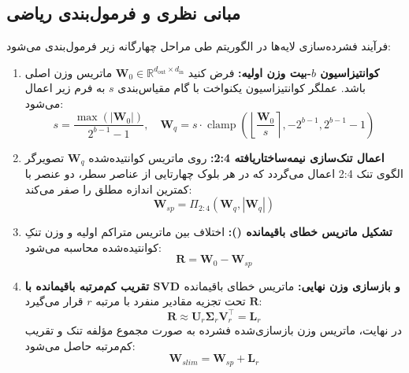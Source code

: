 \subsection{مبانی نظری و فرمول‌بندی ریاضی}
فرآیند فشرده‌سازی لایه‌ها در الگوریتم  طی مراحل چهارگانه زیر فرمول‌بندی می‌شود:
\begin{enumerate}
    \item \textbf{کوانتیزاسیون $b$-بیت وزن اولیه:}
    فرض کنید $\mathbf{W}_0 \in \mathbb{R}^{d_{\text{out}} \times d_{\text{in}}}$ ماتریس وزن اصلی باشد. عملگر کوانتیزاسیون یکنواخت با گام مقیاس‌بندی $s$ به فرم زیر اعمال می‌شود:
    \begin{equation}
    s = \frac{\max(|\mathbf{W}_0|)}{2^{b-1} - 1}, \quad \mathbf{W}_q = s \cdot \operatorname{clamp}\left( \left\lfloor \frac{\mathbf{W}_0}{s} \right\rceil, -2^{b-1}, 2^{b-1} - 1 \right)
    \end{equation}
    \item \textbf{اعمال تنک‌سازی نیمه‌ساختاریافته 2:4:}
    روی ماتریس کوانتیده‌شده $\mathbf{W}_q$ تصویرگر الگوی تنک 2:4 اعمال می‌گردد که در هر بلوک چهارتایی از عناصر سطر، دو عنصر با کمترین اندازه مطلق را صفر می‌کند:
    \begin{equation}
    \mathbf{W}_{sp} = \Pi_{2:4}(\mathbf{W}_q, |\mathbf{W}_q|)
    \end{equation}
    \item \textbf{تشکیل ماتریس خطای باقیمانده ():}
    اختلاف بین ماتریس متراکم اولیه و وزن تنکِ کوانتیده‌شده محاسبه می‌شود:
    \begin{equation}
    \mathbf{R} = \mathbf{W}_0 - \mathbf{W}_{sp}
    \end{equation}
    \item \textbf{تقریب کم‌مرتبه باقیمانده با SVD و بازسازی وزن نهایی:}
    ماتریس خطای باقیمانده $\mathbf{R}$ تحت تجزیه مقادیر منفرد با مرتبه $r$ قرار می‌گیرد:
    \begin{equation}
    \mathbf{R} \approx \mathbf{U}_r \boldsymbol{\Sigma}_r \mathbf{V}_r^\top = \mathbf{L}_r
    \end{equation}
    در نهایت، ماتریس وزن بازسازی‌شده فشرده به صورت مجموع مؤلفه تنک و تقریب کم‌مرتبه حاصل می‌شود:
    \begin{equation}
    \mathbf{W}_{slim} = \mathbf{W}_{sp} + \mathbf{L}_r
    \end{equation}
\end{enumerate}

